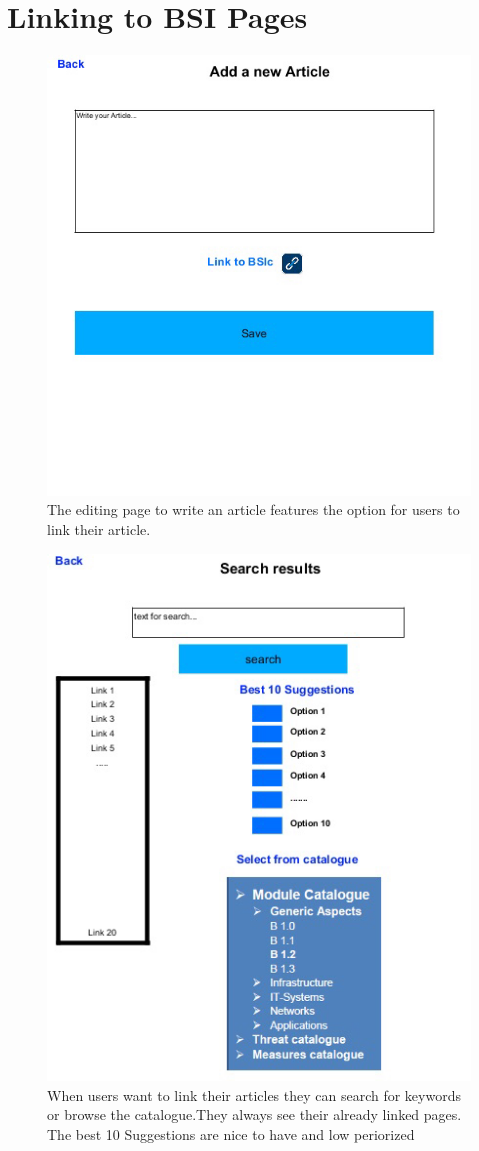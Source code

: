 \section{Linking to BSI Pages}
\label{appendix_bsi_link}

\begin{figure}[h]  
    \centering
    \includegraphics[page=1,width=.8\textwidth]{Pictures/link_to_bsi_1.jpg}
    \caption{The editing page to write an article features the option for users to link their article.}
\end{figure}

\begin{figure}[h]  
    \centering
    \includegraphics[page=1,width=.8\textwidth]{Pictures/link_to_bsi_2.jpg}
    \caption{When users want to link their articles they can search for keywords or browse the catalogue.They always see their already linked pages. The best 10 Suggestions are nice to have and low periorized}
\end{figure}

